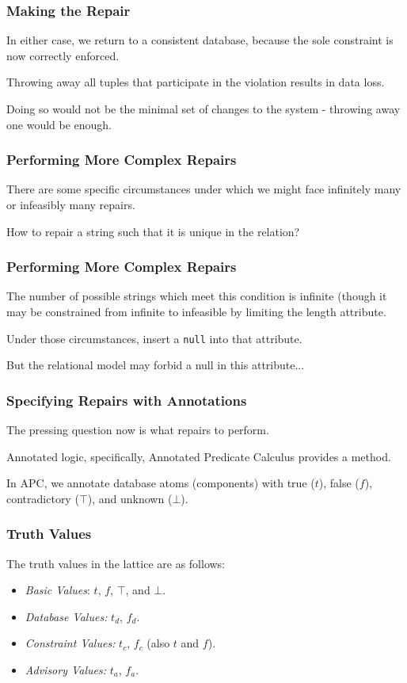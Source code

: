 \begin{frame}
\frametitle{Making the Repair}

In either case, we return to a consistent database, because the sole constraint is now correctly enforced.

Throwing away all tuples that participate in the violation results in data loss.

Doing so would not be the minimal set of changes to the system - throwing away one would be enough.

\end{frame}


\begin{frame}
\frametitle{Performing More Complex Repairs}

There are some specific circumstances under which we might face infinitely many or infeasibly many repairs. 

How to repair a string such that it is unique in the relation? 


\end{frame}


\begin{frame}
\frametitle{Performing More Complex Repairs}

The number of possible strings which meet this condition is infinite (though it may be constrained from infinite to infeasible by limiting the length attribute. 

Under those circumstances, insert a \texttt{null} into that attribute.

But the relational model may forbid a null in this attribute...


\end{frame}


\begin{frame}
\frametitle{Specifying Repairs with Annotations}

The pressing question now is what repairs to perform. 

Annotated logic, specifically, \alert{Annotated Predicate Calculus} provides a method.

In APC, we annotate database atoms (components) with true ($t$), false ($f$), contradictory ($\top$), and unknown ($\bot$).


\end{frame}

\begin{frame}
\frametitle{Truth Values}

The truth values in the lattice are as follows:

\begin{itemize}
\item \textit{Basic Values}: $t$, $f$, $\top$, and $\bot$.
\item \textit{Database Values:} $t_d$, $f_d$.
\item \textit{Constraint Values:} $t_c$, $f_c$ (also $t$ and $f$).
\item \textit{Advisory Values:} $t_a$, $f_a$.
\end{itemize}



\end{frame}

